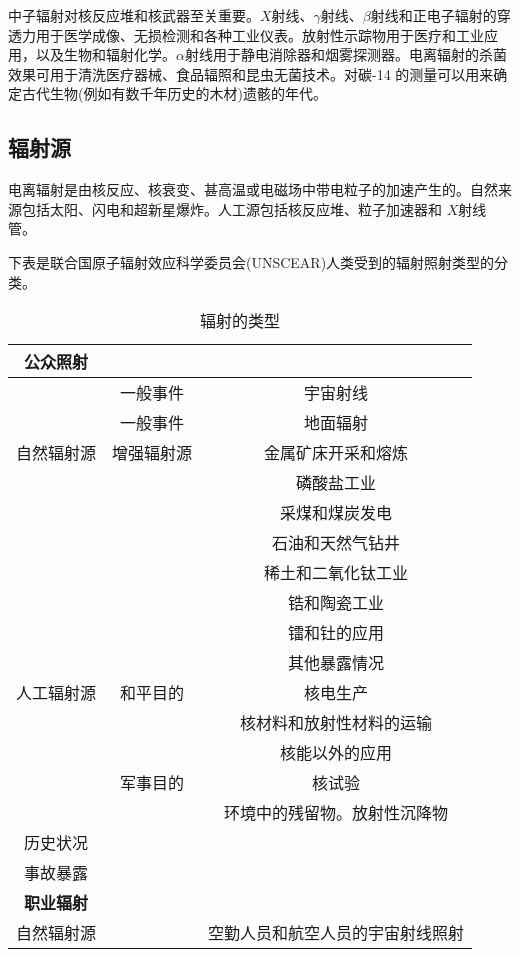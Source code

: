 中子辐射对核反应堆和核武器至关重要。$X$射线、$\gamma$射线、$\beta$射线和正电子辐射的穿透力用于医学成像、无损检测和各种工业仪表。放射性示踪物用于医疗和工业应用，以及生物和辐射化学。$\alpha$射线用于静电消除器和烟雾探测器。电离辐射的杀菌效果可用于清洗医疗器械、食品辐照和昆虫无菌技术。对碳-14 的测量可以用来确定古代生物(例如有数千年历史的木材)遗骸的年代。

\subsection{ 辐射源}
电离辐射是由核反应、核衰变、甚高温或电磁场中带电粒子的加速产生的。自然来源包括太阳、闪电和超新星爆炸。人工源包括核反应堆、粒子加速器和 $X$射线管。

下表是联合国原子辐射效应科学委员会(UNSCEAR)人类受到的辐射照射类型的分类。

\begin{table}[ht]
\centering
\caption{辐射的类型}\label{DLFS_1}
\begin{tabular}{|c|c|c}
\hline
\textbf{公众照射} &  &  \\
\hline
 & 	一般事件 & 宇宙射线\\
\hline
 &  一般事件 & 地面辐射\\
\hline
自然辐射源 & 增强辐射源 & 	金属矿床开采和熔炼\\
\hline
 &  & 磷酸盐工业\\
\hline
 &  & 采煤和煤炭发电\\
\hline
 &  & 石油和天然气钻井\\
\hline
 &  & 稀土和二氧化钛工业\\
\hline
 &  & 锆和陶瓷工业\\
\hline
 &  & 镭和钍的应用\\
\hline
 &  & 其他暴露情况\\
\hline
人工辐射源 & 和平目的 &	核电生产 \\
\hline
 &  & 核材料和放射性材料的运输\\
\hline
 &  & 核能以外的应用\\
\hline
 & 军事目的 & 核试验\\
\hline
 & & 环境中的残留物。放射性沉降物\\
\hline
历史状况 & & \\
\hline
事故暴露 & & \\
\hline
\textbf{职业辐射} & & \\
\hline
自然辐射源 &  & 空勤人员和航空人员的宇宙射线照射\\
\hline
\hline
\hline
 
\hline
\end{tabular}
\end{table}